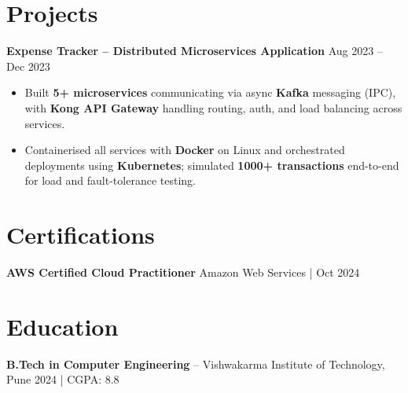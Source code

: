 \documentclass[letterpaper,10pt]{article}
\begin{document}
\section*{Projects}

\textbf{Expense Tracker -- Distributed Microservices Application} \hfill Aug 2023 -- Dec 2023
\begin{itemize}[leftmargin=*]
    \item Built \textbf{5+ microservices} communicating via async \textbf{Kafka} messaging (IPC), with \textbf{Kong API Gateway} handling routing, auth, and load balancing across services.
    \item Containerised all services with \textbf{Docker} on Linux and orchestrated deployments using \textbf{Kubernetes}; simulated \textbf{1000+ transactions} end-to-end for load and fault-tolerance testing.
\end{itemize}

\section*{Certifications}
\textbf{AWS Certified Cloud Practitioner} \hfill Amazon Web Services \;|\; Oct 2024

\section*{Education}
\textbf{B.Tech in Computer Engineering} -- Vishwakarma Institute of Technology, Pune \hfill 2024 \;|\; CGPA: 8.8
\end{document}
